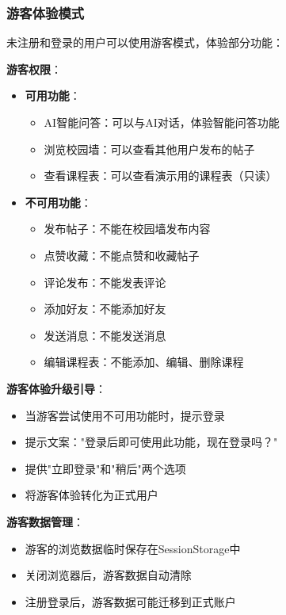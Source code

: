 \documentclass[12pt,a4paper]{article}
\begin{document}
\subsubsection{游客体验模式}

未注册和登录的用户可以使用游客模式，体验部分功能：

\textbf{游客权限}：
\begin{itemize}
    \item \textbf{可用功能}：
        \begin{itemize}
            \item AI智能问答：可以与AI对话，体验智能问答功能
            \item 浏览校园墙：可以查看其他用户发布的帖子
            \item 查看课程表：可以查看演示用的课程表（只读）
        \end{itemize}
    \item \textbf{不可用功能}：
        \begin{itemize}
            \item 发布帖子：不能在校园墙发布内容
            \item 点赞收藏：不能点赞和收藏帖子
            \item 评论发布：不能发表评论
            \item 添加好友：不能添加好友
            \item 发送消息：不能发送消息
            \item 编辑课程表：不能添加、编辑、删除课程
        \end{itemize}
\end{itemize}

\textbf{游客体验升级引导}：
\begin{itemize}
    \item 当游客尝试使用不可用功能时，提示登录
    \item 提示文案："登录后即可使用此功能，现在登录吗？"
    \item 提供"立即登录"和"稍后"两个选项
    \item 将游客体验转化为正式用户
\end{itemize}

\textbf{游客数据管理}：
\begin{itemize}
    \item 游客的浏览数据临时保存在SessionStorage中
    \item 关闭浏览器后，游客数据自动清除
    \item 注册登录后，游客数据可能迁移到正式账户
\end{itemize}
\end{document}
